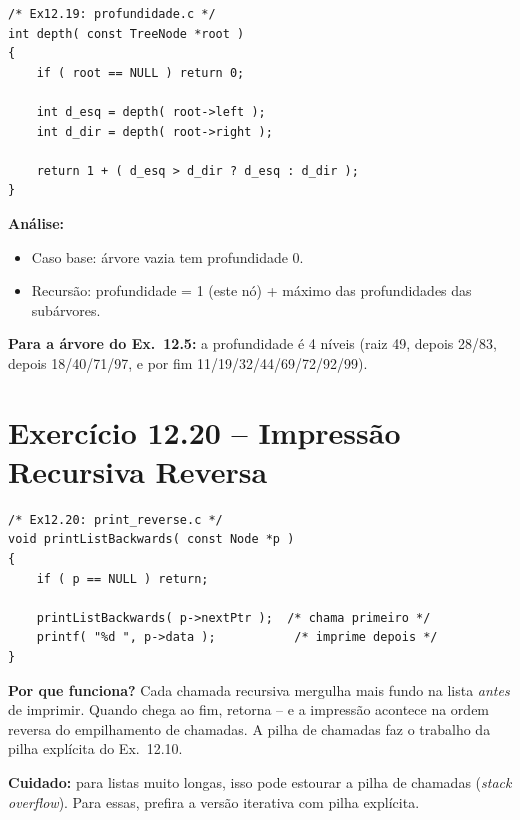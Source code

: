 \documentclass[12pt,a4paper]{article}
\begin{document}
\begin{respostabox}
\begin{lstlisting}
/* Ex12.19: profundidade.c */
int depth( const TreeNode *root )
{
    if ( root == NULL ) return 0;

    int d_esq = depth( root->left );
    int d_dir = depth( root->right );

    return 1 + ( d_esq > d_dir ? d_esq : d_dir );
}
\end{lstlisting}

\textbf{Análise:}
\begin{itemize}[noitemsep]
  \item Caso base: árvore vazia tem profundidade 0.
  \item Recursão: profundidade = 1 (este nó) + máximo das profundidades das subárvores.
\end{itemize}

\textbf{Para a árvore do Ex.~12.5:} a profundidade é 4 níveis (raiz 49, depois
28/83, depois 18/40/71/97, e por fim 11/19/32/44/69/72/92/99).
\end{respostabox}

\section{Exercício 12.20 -- Impressão Recursiva Reversa}

\begin{respostabox}
\begin{lstlisting}
/* Ex12.20: print_reverse.c */
void printListBackwards( const Node *p )
{
    if ( p == NULL ) return;

    printListBackwards( p->nextPtr );  /* chama primeiro */
    printf( "%d ", p->data );           /* imprime depois */
}
\end{lstlisting}

\textbf{Por que funciona?} Cada chamada recursiva mergulha mais fundo na lista
\textit{antes} de imprimir. Quando chega ao fim, retorna -- e a impressão
acontece na ordem reversa do empilhamento de chamadas. A pilha de chamadas
faz o trabalho da pilha explícita do Ex.~12.10.

\textbf{Cuidado:} para listas muito longas, isso pode estourar a pilha de
chamadas (\textit{stack overflow}). Para essas, prefira a versão iterativa
com pilha explícita.
\end{respostabox}
\end{document}
